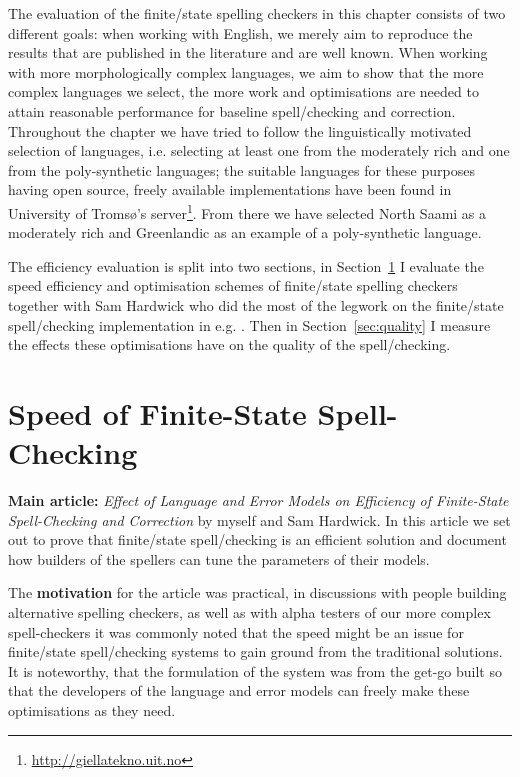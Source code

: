 \documentclass[officiallayout]{unihelcompling}
\begin{document}
The evaluation of the finite\-/state spelling checkers in this chapter consists
of two different goals: when working with English, we merely aim to reproduce
the results that are published in the literature and are well known. When
working with more morphologically complex languages, we aim to show that the
more complex languages we select, the more work and optimisations are needed to
attain reasonable performance for baseline spell\-/checking and correction.
Throughout the chapter we have tried to follow the linguistically motivated
selection of languages, i.e. selecting at least one from the moderately rich
and one from the poly-synthetic languages; the suitable languages for these
purposes having open source, freely available implementations have been found
in University of Tromsø's server\footnote{\url{http://giellatekno.uit.no}}.
From there we have selected North Saami as a moderately rich and Greenlandic as
an example of a poly-synthetic language.

The efficiency evaluation is split into two sections, in
Section~\ref{sec:speed} I evaluate the speed efficiency and optimisation
schemes of finite\-/state spelling checkers together with Sam Hardwick who did
the most of the legwork on the finite\-/state spell\-/checking implementation
in e.g.  \citep{linden2011hfst}. Then in Section~\ref{sec:quality} I measure
the effects these optimisations have on the quality of the spell\-/checking.

\section{Speed of Finite-State Spell-Checking}
\label{sec:speed}

\textbf{Main article:} \emph{Effect of Language and Error Models on Efficiency
of Finite-State Spell-Checking and Correction} by myself and Sam Hardwick. In
this article we set out to prove that finite\-/state spell\-/checking is an
efficient solution and document how builders of the spellers can tune the
parameters of their models.

The \textbf{motivation} for the article was practical, in discussions with
people building alternative spelling checkers, as well as with alpha testers of
our more complex spell-checkers it was commonly noted that the speed might be
an issue for finite\-/state spell\-/checking systems to gain ground from the
traditional solutions. It is noteworthy, that the formulation of the system was
from the get-go built so that the developers of the language and error models
can freely make these optimisations as they need.
\end{document}
